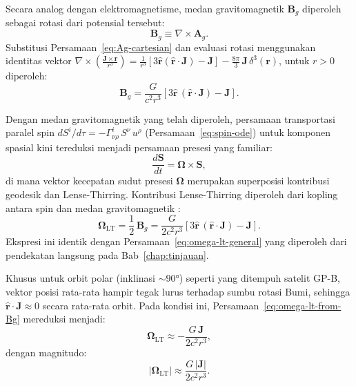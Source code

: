 Secara analog dengan elektromagnetisme, medan gravitomagnetik
$\mathbf{B}_g$ diperoleh sebagai rotasi dari potensial tersebut:
\begin{equation}
    \mathbf{B}_g \equiv \nabla \times \mathbf{A}_g.
    \label{eq:Bg-def}
\end{equation}
Substitusi Persamaan~\eqref{eq:Ag-cartesian} dan evaluasi rotasi
menggunakan identitas vektor
$\nabla \times \left(\frac{\mathbf{J} \times \mathbf{r}}{r^3}\right)
= \frac{1}{r^3}\left[3\hat{\mathbf{r}}(\hat{\mathbf{r}} \cdot \mathbf{J})
- \mathbf{J}\right] - \frac{8\pi}{3}\,\mathbf{J}\,\delta^3(\mathbf{r})$,
untuk $r > 0$ diperoleh:
\begin{equation}
    \mathbf{B}_g = \frac{G}{c^2 r^3}
    \left[3\hat{\mathbf{r}}\,(\hat{\mathbf{r}} \cdot \mathbf{J}) - \mathbf{J}\right].
    \label{eq:Bg-explicit}
\end{equation}

Dengan medan gravitomagnetik yang telah diperoleh,
persamaan transportasi paralel spin
$dS^i/d\tau = -\Gamma^i_{\nu\rho}\, S^\nu\, u^\rho$
(Persamaan~\ref{eq:spin-ode}) untuk komponen spasial
kini tereduksi menjadi persamaan presesi yang familiar:
\begin{equation}
    \frac{d\mathbf{S}}{dt} = \bm{\Omega} \times \mathbf{S},
    \label{eq:precession-eq}
\end{equation}
di mana vektor kecepatan sudut presesi $\bm{\Omega}$ merupakan
superposisi kontribusi geodesik dan Lense-Thirring.
Kontribusi Lense-Thirring diperoleh dari kopling antara spin
dan medan gravitomagnetik \parencite{Will2014Confrontation}:
\begin{equation}
    \bm{\Omega}_{\text{LT}} = \frac{1}{2}\,\mathbf{B}_g
    = \frac{G}{2c^2 r^3}
    \left[3\hat{\mathbf{r}}\,(\hat{\mathbf{r}} \cdot \mathbf{J}) - \mathbf{J}\right].
    \label{eq:omega-lt-from-Bg}
\end{equation}
Ekspresi ini identik dengan Persamaan~\eqref{eq:omega-lt-general}
yang diperoleh dari pendekatan langsung pada Bab~\ref{chap:tinjauan}.

Khusus untuk orbit polar (inklinasi $\sim 90°$)
seperti yang ditempuh satelit GP-B,
vektor posisi rata-rata hampir tegak lurus terhadap sumbu rotasi Bumi,
sehingga $\hat{\mathbf{r}} \cdot \mathbf{J} \approx 0$ secara rata-rata orbit.
Pada kondisi ini, Persamaan~\eqref{eq:omega-lt-from-Bg} mereduksi menjadi:
\begin{equation}
    \bm{\Omega}_{\text{LT}} \approx -\frac{G\,\mathbf{J}}{2c^2 r^3},
    \label{eq:omega-lt-polar-exact}
\end{equation}
dengan magnitudo:
\begin{equation}
    \boxed{|\bm{\Omega}_{\text{LT}}| \approx \frac{G\,|\mathbf{J}|}{2c^2 r^3}.}
    \label{eq:omega-lt-magnitude-half}
\end{equation}

